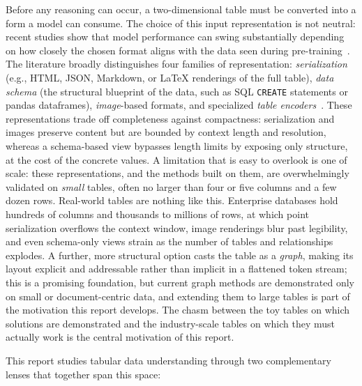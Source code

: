 Before any reasoning can occur, a two-dimensional table must be converted into a form a model can consume. The choice of this input representation is not neutral: recent studies show that model performance can swing substantially depending on how closely the chosen format aligns with the data seen during pre-training~\cite{sui2024table}. The literature broadly distinguishes four families of representation: \emph{serialization} (e.g., HTML, JSON, Markdown, or LaTeX renderings of the full table), \emph{data schema} (the structural blueprint of the data, such as SQL \texttt{CREATE} statements or pandas dataframes), \emph{image}-based formats, and specialized \emph{table encoders}~\cite{wu2025tabular}. These representations trade off completeness against compactness: serialization and images preserve content but are bounded by context length and resolution, whereas a schema-based view bypasses length limits by exposing only structure, at the cost of the concrete values. A limitation that is easy to overlook is one of scale: these representations, and the methods built on them, are overwhelmingly validated on \emph{small} tables, often no larger than four or five columns and a few dozen rows. Real-world tables are nothing like this. Enterprise databases hold hundreds of columns and thousands to millions of rows, at which point serialization overflows the context window, image renderings blur past legibility, and even schema-only views strain as the number of tables and relationships explodes. A further, more structural option casts the table as a \emph{graph}, making its layout explicit and addressable rather than implicit in a flattened token stream; this is a promising foundation, but current graph methods are demonstrated only on small or document-centric data, and extending them to large tables is part of the motivation this report develops. The chasm between the toy tables on which solutions are demonstrated and the industry-scale tables on which they must actually work is the central motivation of this report.

This report studies tabular data understanding through two complementary lenses that together span this space:


